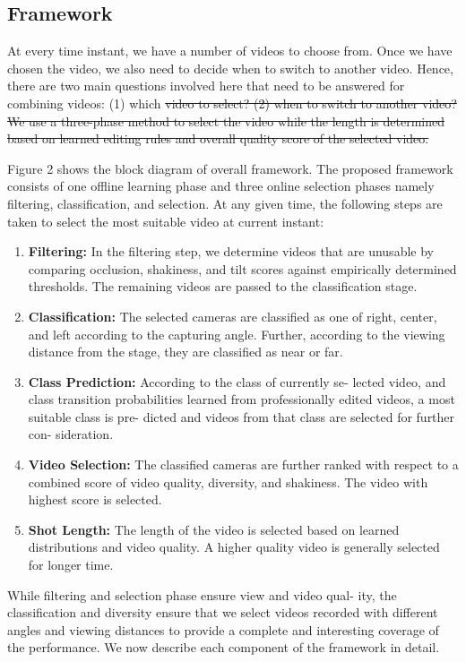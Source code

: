 \documentclass{sig-alternate}
\providecommand{\DIFadd}[1]{{\protect\color{blue}\uwave{#1}}} %
\providecommand{\DIFdel}[1]{{\protect\color{red}\sout{#1}}}                      %
\providecommand{\DIFaddbegin}{} %
\providecommand{\DIFaddend}{} %
\providecommand{\DIFdelbegin}{} %
\providecommand{\DIFdelend}{} %
\begin{document}
\subsection{Framework}
At every time instant, we have a number of videos to choose
from. Once we have chosen the video, we also need to decide when
to switch to another video. Hence, there are two main questions
involved here that need to be answered for combining videos: (1)
which \DIFdelbegin \DIFdel{video to select? (2) when to switch to another video? We
use a three-phase method to select the video while the length is determined based on learned editing rules and overall quality score
of the selected video.
}\DIFdelend \DIFaddbegin \DIFadd{this is framework
}\DIFaddend 

Figure 2 shows the block diagram of overall framework. The
proposed framework consists of one offline learning phase and three online selection phases namely filtering, classification, and selection. At any given time, the following steps are taken to select the
most suitable video at current instant:
\begin{enumerate}
\item \textbf{Filtering:} In the filtering step, we determine videos that are
unusable by comparing occlusion, shakiness, and tilt scores
against empirically determined thresholds. The remaining
videos are passed to the classification stage.
\item \textbf{Classification:} The selected cameras are classified as one
of right, center, and left according to the capturing angle.
Further, according to the viewing distance from the stage,
they are classified as near or far.
\item \textbf{Class Prediction:} According to the class of currently se-
lected video, and class transition probabilities learned from
professionally edited videos, a most suitable class is pre-
dicted and videos from that class are selected for further con-
sideration.
\item \textbf{Video Selection:} The classified cameras are further ranked
with respect to a combined score of video quality, diversity,
and shakiness. The video with highest score is selected.
\item \textbf{Shot Length:} The length of the video is selected based on
learned distributions and video quality. A higher quality video
is generally selected for longer time.

\end{enumerate}

While filtering and selection phase ensure view and video qual-
ity, the classification and diversity ensure that we select videos
recorded with different angles and viewing distances to provide a
complete and interesting coverage of the performance. We now
describe each component of the framework in detail.
\end{document}
